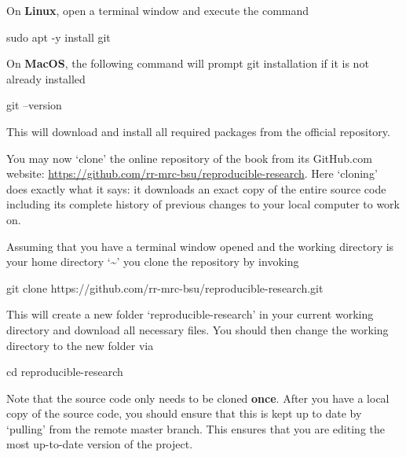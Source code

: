 \documentclass[]{book}
\newenvironment{Shaded}{\begin{snugshade}}{\end{snugshade}}
\newcommand{\FunctionTok}[1]{\textcolor[rgb]{0.00,0.00,0.00}{#1}}
\newcommand{\BuiltInTok}[1]{#1}
\newcommand{\NormalTok}[1]{#1}
\begin{document}
On \textbf{Linux}, open a terminal window and execute the command

\begin{Shaded}
\begin{Highlighting}[]
\FunctionTok{sudo}\NormalTok{ apt -y install git}
\end{Highlighting}
\end{Shaded}

On \textbf{MacOS}, the following command will prompt git installation if
it is not already installed

\begin{Shaded}
\begin{Highlighting}[]
\FunctionTok{git}\NormalTok{ --version}
\end{Highlighting}
\end{Shaded}

This will download and install all required packages from the official
repository.

You may now `clone' the online repository of the book from its
GitHub.com website:
\url{https://github.com/rr-mrc-bsu/reproducible-research}. Here
`cloning' does exactly what it says: it downloads an exact copy of the
entire source code including its complete history of previous changes to
your local computer to work on.

Assuming that you have a terminal window opened and the working
directory is your home directory `\textasciitilde{}' you clone the
repository by invoking

\begin{Shaded}
\begin{Highlighting}[]
\FunctionTok{git}\NormalTok{ clone https://github.com/rr-mrc-bsu/reproducible-research.git}
\end{Highlighting}
\end{Shaded}

This will create a new folder `reproducible-research' in your current
working directory and download all necessary files. You should then
change the working directory to the new folder via

\begin{Shaded}
\begin{Highlighting}[]
\BuiltInTok{cd}\NormalTok{ reproducible-research}
\end{Highlighting}
\end{Shaded}

Note that the source code only needs to be cloned \textbf{once}. After
you have a local copy of the source code, you should ensure that this is
kept up to date by `pulling' from the remote master branch. This ensures
that you are editing the most up-to-date version of the project.
\end{document}
